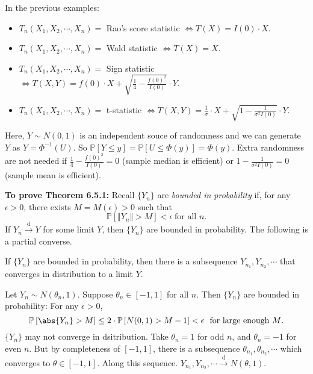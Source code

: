 \documentclass[a4paper]{article}
\begin{document}
\begin{remark}
	In the previous examples:
	\begin{itemize}[leftmargin=*]
		\item $T_n(X_1,X_2,\cdots,X_n) = $ Rao's score statistic $\iff T(X) = I(0) \cdot X$.
		\item $T_n(X_1,X_2,\cdots,X_n) = $ Wald statistic $\iff T(X) = X$.
		\item $T_n(X_1,X_2,\cdots,X_n) = $ Sign statistic $\iff T(X,Y) = f(0) \cdot X + \sqrt{\frac{1}{4} - \frac{f(0)^2}{I(0)}} \cdot Y$.
		\item $T_n(X_1,X_2,\cdots,X_n) = $ t-statistic $\iff T(X,Y) = \frac{1}{\sigma} \cdot X + \sqrt{1-\frac{1}{\sigma^2I(0)}}\cdot Y$.
	\end{itemize}
	Here, $Y \sim N(0,1)$ is an independent souce of randomness and we can generate $Y$ as $Y = \Phi^{-1}(U)$. So $\mathbb{P}[Y \leq y] = \mathbb{P}[U \leq \Phi(y)] = \Phi(y)$. Extra randomness are not needed if $\frac{1}{4} - \frac{f(0)^2}{I(0)} = 0$ (sample median is efficient) or $1-\frac{1}{\sigma^2I(0)} = 0$ (sample mean is efficient).
\end{remark}

\noindent\textbf{To prove Theorem 6.5.1:} Recall $\{Y_n\}$ are \emph{bounded in probability} if, for any $\epsilon > 0$, there exists $M = M(\epsilon) > 0$ such that
\begin{equation*}
	\mathbb{P} \left[\Vert Y_n \Vert > M \right] < \epsilon \ \text{for all $n$.}
\end{equation*}
If $Y_n \stackrel{\text{d}}{\longrightarrow} Y$ for some limit $Y$, then $\{Y_n\}$ are bounded in probability. The following is a partial converse.

\begin{lemma}
	If $\{Y_n\}$ are bounded in probability, then there is a subsequence $Y_{n_1},Y_{n_2},\cdots$ that converges in distribution to a limit $Y$. 
\end{lemma}

\begin{eg}
	Let $Y_n \sim N(\theta_n,1)$. Suppose $\theta_n \in [-1,1]$ for all $n$. Then $\{Y_n\}$ are bounded in probability: For any $\epsilon > 0$,
	\begin{equation*}
		\mathbb{P}\left[\abs{Y_n} > M\right] \leq 2 \cdot \mathbb{P} \left[N(0,1) > M-1 \right] < \epsilon \ \text{ for large enough $M$.} 
	\end{equation*}
	$\{Y_n\}$ may not converge in dsitribution. Take $\theta_n = 1$ for odd $n$, and $\theta_n = -1$ for even $n$. But by completeness of $[-1,1]$, there is a subsequence $\theta_{n_1},\theta_{n_2},\cdots$ which converges to $\theta \in [-1,1]$. Along this sequence. $Y_{n_1},Y_{n_2},\cdots \stackrel{\text{d}}{\longrightarrow} N(\theta,1)$.
\end{eg}
\end{document}
